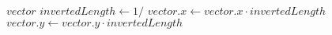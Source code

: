 \begin{algorithm}[!ht]\small
\caption{}
\label{alg:vectornormalized}
	\begin{algorithmic}[1]
		\Require $\mathit{vector}$
		\State $\mathit{invertedLength} \gets 1 /$ 
		\State $\mathit{vector.x} \gets \mathit{vector.x} \cdot \mathit{invertedLength}$
		\State $\mathit{vector.y} \gets \mathit{vector.y} \cdot \mathit{invertedLength}$
	\end{algorithmic}
\end{algorithm}
